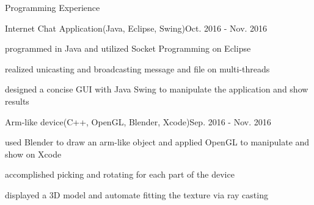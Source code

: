 \documentclass{resume} %
\begin{document}
\begin{rSection}{Programming Experience}

\begin{rSubsection}{Internet Chat Application(Java, Eclipse, Swing)}{Oct. 2016 - Nov. 2016}{}{}
\item programmed in Java and utilized Socket Programming on Eclipse
\item realized unicasting and broadcasting message and file on multi-threads
\item designed a concise GUI with Java Swing to manipulate the application and show results
\end{rSubsection}



\begin{rSubsection}{Arm-like device(C++, OpenGL, Blender, Xcode)}{Sep. 2016 - Nov. 2016}{}{}
\item used Blender to draw an arm-like object and applied OpenGL to manipulate and show on Xcode
\item accomplished picking and rotating for each part of the device 
\item displayed a 3D model and automate fitting the texture via ray casting
\end{rSubsection}







\end{rSection}
\end{document}
